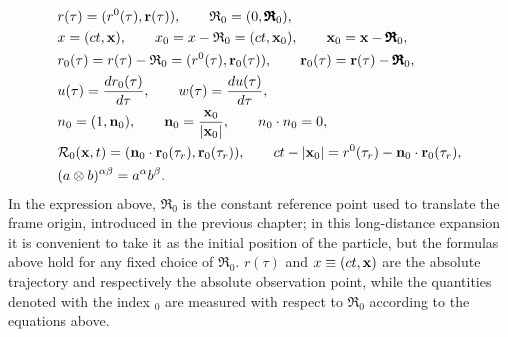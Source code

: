 \begin{highlightbox}
\begin{align}
    &r(\tau)=(r^0(\tau),{\bf r}(\tau)),\qquad
    {\mathfrak R}_0=(0,\pmb{\mathfrak R}_0),\nonumber\\
    &x=(ct,{\bf x}),\qquad
    x_0=x-{\mathfrak R}_0=(ct,{\bf x}_0),\qquad
    {\bf x}_0={\bf x}-\pmb{\mathfrak R}_0,\nonumber\\
    &r_0(\tau)=r(\tau)-{\mathfrak R}_0=(r^0(\tau),{\bf r}_0(\tau)),\qquad
    {\bf r}_0(\tau)={\bf r}(\tau)-\pmb{\mathfrak R}_0,\nonumber\\
    &u(\tau)=\frac{dr_0(\tau)}{d\tau},\qquad
    w(\tau)=\frac{du(\tau)}{d\tau},\nonumber\\
    &n_0=(1,{\bf n}_0),\qquad
    {\bf n}_0=\frac{{\bf x}_0}{|{\bf x}_0|},\qquad
    n_0\cdot n_0=0,\nonumber\\
    &{\cal R}_0({\bf x},t)=({\bf n}_0\cdot{\bf r}_0(\tau_r),{\bf r}_0(\tau_r)),\qquad
    ct-|{\bf x}_0|=r^0(\tau_r)-{\bf n}_0\cdot{\bf r}_0(\tau_r),\nonumber\\
    &(a\otimes b)^{\alpha\beta}=a^\alpha b^\beta.
\end{align}
In the expression above, $\pmb{\mathfrak{R}}_0$ is the constant reference point used to translate the frame origin, introduced in the previous chapter; in this long-distance expansion it is convenient to take it as the initial position of the particle, but the formulas above hold for any fixed choice of $\pmb{\mathfrak{R}}_0$. $r(\tau)$ and $x\equiv(ct,{\bf x})$ are the absolute trajectory and respectively the absolute observation point, while the quantities denoted with the index $_0$ are measured with respect to $\pmb{\mathfrak{R}}_0$ according to the equations above.

\end{highlightbox}
